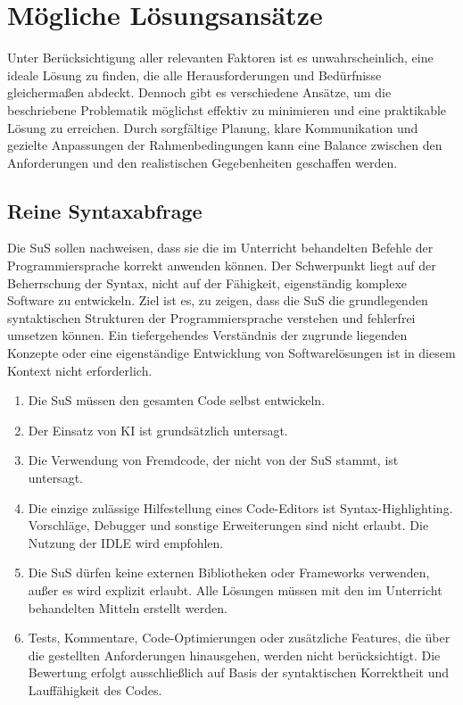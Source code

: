\documentclass[a4paper,12pt]{article}
\begin{document}
\section{Mögliche Lösungsansätze}
Unter Berücksichtigung aller relevanten Faktoren ist es unwahrscheinlich, eine ideale Lösung zu finden, die alle Herausforderungen und Bedürfnisse gleichermaßen abdeckt. Dennoch gibt es verschiedene Ansätze, um die beschriebene Problematik möglichst effektiv zu minimieren und eine praktikable Lösung zu erreichen. Durch sorgfältige Planung, klare Kommunikation und gezielte Anpassungen der Rahmenbedingungen kann eine Balance zwischen den Anforderungen und den realistischen Gegebenheiten geschaffen werden.


\subsection{Reine Syntaxabfrage}
Die SuS sollen nachweisen, dass sie die im Unterricht behandelten Befehle der Programmiersprache korrekt anwenden können. Der Schwerpunkt liegt auf der Beherrschung der Syntax, nicht auf der Fähigkeit, eigenständig komplexe Software zu entwickeln. Ziel ist es, zu zeigen, dass die SuS die grundlegenden syntaktischen Strukturen der Programmiersprache verstehen und fehlerfrei umsetzen können. Ein tiefergehendes Verständnis der zugrunde liegenden Konzepte oder eine eigenständige Entwicklung von Softwarelösungen ist in diesem Kontext nicht erforderlich.

\begin{enumerate}[label=\S\ \arabic*]
    \item Die SuS müssen den gesamten Code selbst entwickeln.
    \item Der Einsatz von KI ist grundsätzlich untersagt.
    \item Die Verwendung von Fremdcode, der nicht von der SuS stammt, ist untersagt.
    \item Die einzige zulässige Hilfestellung eines Code-Editors ist Syntax-Highlighting. Vorschläge, Debugger und sonstige Erweiterungen sind nicht erlaubt. Die Nutzung der IDLE wird empfohlen.
    \item Die SuS dürfen keine externen Bibliotheken oder Frameworks verwenden, außer es wird explizit erlaubt. Alle Lösungen müssen mit den im Unterricht behandelten Mitteln erstellt werden.
    \item Tests, Kommentare, Code-Optimierungen oder zusätzliche Features, die über die gestellten Anforderungen hinausgehen, werden nicht berücksichtigt. Die Bewertung erfolgt ausschließlich auf Basis der syntaktischen Korrektheit und Lauffähigkeit des Codes.
\end{enumerate}
\end{document}
